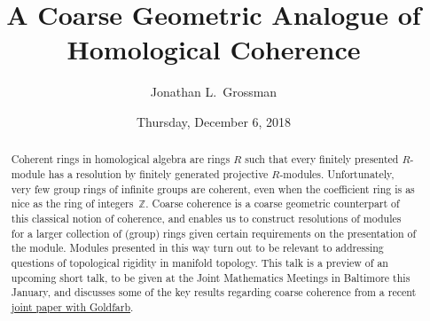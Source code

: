 \documentclass{UAmathtalk}
\author{Jonathan L.\ Grossman}
\title{A Coarse Geometric Analogue of Homological Coherence}
\date{Thursday, December 6, 2018}
\begin{document}
\maketitle

\begin{abstract}
Coherent rings in homological algebra are rings $R$ such that every finitely presented $R$-module has a resolution by finitely generated projective $R$-modules. Unfortunately, very few group rings of infinite groups are coherent, even when the coefficient ring is as nice as the ring of integers~$\mathbb{Z}$. Coarse coherence is a coarse geometric counterpart of this classical notion of coherence, and enables us to construct resolutions of modules for a larger collection of (group) rings given certain requirements on the presentation of the module. Modules presented in this way turn out to be relevant to addressing questions of topological rigidity in manifold topology.  This talk is a preview of an upcoming short talk, to be given at the Joint Mathematics Meetings in Baltimore this January, and discusses some of the key results regarding coarse coherence from a recent \href{https://dx.doi.org/10.1017/S0004972718000977}{joint paper with Goldfarb}.
\end{abstract}
\end{document}

